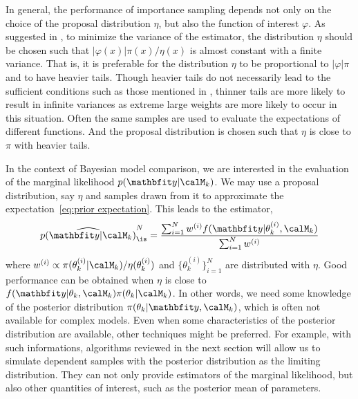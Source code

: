 In general, the performance of importance sampling depends not only on the
choice of the proposal distribution $\eta$, but also the function of interest
$\varphi$. As suggested in \cite[][sec.~3.3.2]{Robert:2004tn}, to minimize the
variance of the estimator, the distribution $\eta$ should be chosen such that
$|\varphi(x)|\pi(x)/\eta(x)$ is almost constant with a finite variance. That
is, it is preferable for the distribution $\eta$ to be proportional to
$|\varphi|\pi$ and to have heavier tails. Though heavier tails do not
necessarily lead to the sufficient conditions such as those mentioned in
\cite{Geweke:1989tm}, thinner tails are more likely to result in infinite
variances as extreme large weights are more likely to occur in this situation.
Often the same samples are used to evaluate the expectations of different
functions. And the proposal distribution is chosen such that $\eta$ is close
to $\pi$ with heavier tails.


In the context of Bayesian model comparison, we are interested in the
evaluation of the marginal likelihood $p(\data|\calM_k)$. We may use a
proposal distribution, say $\eta$ and samples drawn from it to approximate the
expectation~\eqref{eq:prior expectation}. This leads to the estimator,
\begin{equation}
  \widehat{p(\data|\calM_k)}_{\is}^N =
  \frac{\sum_{i=1}^N w^{(i)} f(\data|\theta_k^{(i)},\calM_k)}
  {\sum_{i=1}^N w^{(i)}}
\end{equation}
where $w^{(i)}\propto\pi(\theta_k^{(i)}|\calM_k)/\eta(\theta_k^{(i)})$ and
$\{\theta_k^{(i)}\}_{i=1}^N$ are distributed with $\eta$. Good performance can
be obtained when $\eta$ is close to
$f(\data|\theta_k,\calM_k)\pi(\theta_k|\calM_k)$. In other words, we need some
knowledge of the posterior distribution $\pi(\theta_k|\data,\calM_k)$, which
is often not available for complex models. Even when some characteristics of
the posterior distribution are available, other techniques might be preferred.
For example, with such informations, algorithms reviewed in the next section
will allow us to simulate dependent samples with the posterior distribution as
the limiting distribution. They can not only provide estimators of the
marginal likelihood, but also other quantities of interest, such as the
posterior mean of parameters.

